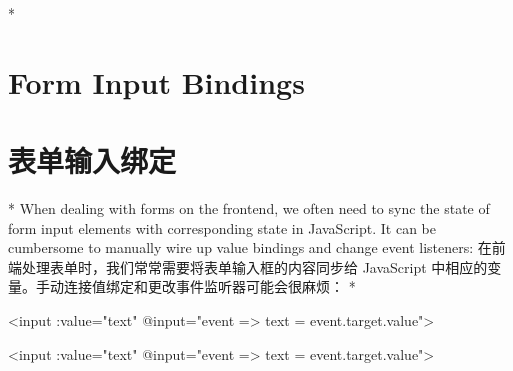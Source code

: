\begin{paracol}{2}

\switchcolumn[0]*%
\section{Form Input Bindings}
\switchcolumn
\section{表单输入绑定}
\switchcolumn[0]*%
When dealing with forms on the frontend, we often need to sync the state
of form input elements with corresponding state in JavaScript. It can be
cumbersome to manually wire up value bindings and change event
listeners:
\switchcolumn
在前端处理表单时，我们常常需要将表单输入框的内容同步给 JavaScript
中相应的变量。手动连接值绑定和更改事件监听器可能会很麻烦：
\switchcolumn[0]*%
\begin{codeHtml}
    <input
      :value="text"
      @input="event => text = event.target.value">
    \end{codeHtml}
\switchcolumn
\begin{codeHtml}
<input
    :value="text"
    @input="event => text = event.target.value">
\end{codeHtml}



\end{paracol}
